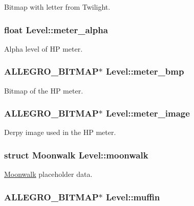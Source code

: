\-Bitmap with letter from \-Twilight. \hypertarget{structLevel_a246ce1ecf1523db218cf067df15e511f}{
\subsubsection[{meter\-\_\-alpha}]{\setlength{\rightskip}{0pt plus 5cm}float {\bf \-Level\-::meter\-\_\-alpha}}}\label{structLevel_a246ce1ecf1523db218cf067df15e511f}
\-Alpha level of \-H\-P meter. \hypertarget{structLevel_a4e78a54cbf3cdcc804f65acb03cef0b3}{
\subsubsection[{meter\-\_\-bmp}]{\setlength{\rightskip}{0pt plus 5cm}\-A\-L\-L\-E\-G\-R\-O\-\_\-\-B\-I\-T\-M\-A\-P$\ast$ {\bf \-Level\-::meter\-\_\-bmp}}}\label{structLevel_a4e78a54cbf3cdcc804f65acb03cef0b3}
\-Bitmap of the \-H\-P meter. \hypertarget{structLevel_a371c97dfa3d564a19648cb1b72edbf60}{
\subsubsection[{meter\-\_\-image}]{\setlength{\rightskip}{0pt plus 5cm}\-A\-L\-L\-E\-G\-R\-O\-\_\-\-B\-I\-T\-M\-A\-P$\ast$ {\bf \-Level\-::meter\-\_\-image}}}\label{structLevel_a371c97dfa3d564a19648cb1b72edbf60}
\-Derpy image used in the \-H\-P meter. \hypertarget{structLevel_ab9e39b9ac0f342332e034c59d55d6a07}{
\subsubsection[{moonwalk}]{\setlength{\rightskip}{0pt plus 5cm}struct {\bf \-Moonwalk} {\bf \-Level\-::moonwalk}}}\label{structLevel_ab9e39b9ac0f342332e034c59d55d6a07}
\hyperlink{structMoonwalk}{\-Moonwalk} placeholder data. \hypertarget{structLevel_ad4d4190d232b674d4211f3355a9b7a93}{
\subsubsection[{muffin}]{\setlength{\rightskip}{0pt plus 5cm}\-A\-L\-L\-E\-G\-R\-O\-\_\-\-B\-I\-T\-M\-A\-P$\ast$ {\bf \-Level\-::muffin}}}\label{structLevel_ad4d4190d232b674d4211f3355a9b7a93}
